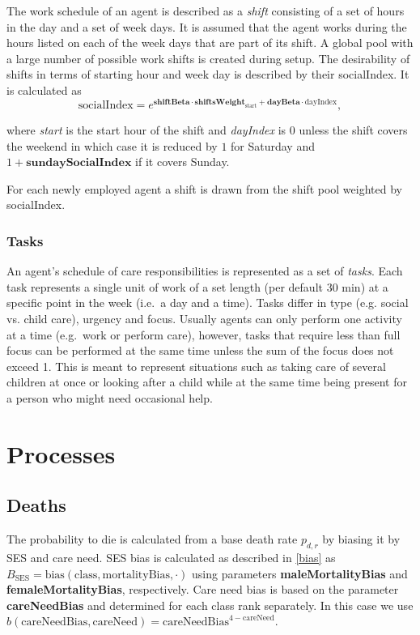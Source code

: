 \documentclass{article}
\begin{document}
The work schedule of an agent is described as a \emph{shift} consisting of a set of hours in the day and a set of week days. It is assumed that the agent works during the hours listed on each of the week days that are part of its shift. A global pool with a large number of possible work shifts is created during setup. The desirability of shifts in terms of starting hour and week day is described by their \textsf{socialIndex}. It is calculated as 
\[
\textrm{socialIndex} = e^{\textbf{shiftBeta} \cdot \textbf{shiftsWeight}_\textrm{start} + \textbf{dayBeta} \cdot \textrm{dayIndex}},
\]

where \textit{start} is the start hour of the shift and \textit{dayIndex} is $0$ unless the shift covers the weekend in which case it is reduced by $1$ for Saturday and $1+\textbf{sundaySocialIndex}$ if it covers Sunday.

For each newly employed agent a shift is drawn from the shift pool weighted by \textsf{socialIndex}.

\subsubsection*{Tasks}\label{tasks}

An agent's schedule of care responsibilities is represented as a set of \emph{tasks}. Each task represents a single unit of work of a set length (per default 30 min) at a specific point in the week (i.e.~a day and a time). Tasks differ in type (e.g. social vs. child care), urgency and focus. Usually agents can only perform one activity at a time (e.g.~work or perform care), however, tasks that require less than full focus can be performed at the same time unless the sum of the focus does not exceed 1. This is meant to represent situations such as taking care of several children at once or looking after a child while at the same time being present for a person who might need occasional help.

\section{Processes}

\subsection{Deaths} 

The probability to die is calculated from a base death rate $p_{d,r}$ by biasing it by SES and care need. SES bias is calculated as described in \ref{bias} as $B_\textrm{SES}=\textrm{bias}(\textrm{class}, \textrm{mortalityBias}, \cdot)$ using parameters \textbf{maleMortalityBias} and \textbf{femaleMortalityBias}, respectively. Care need bias is based on the parameter \textbf{careNeedBias} and determined for each class rank separately. In this case we use $b(\textrm{careNeedBias}, \textrm{careNeed}) = \textrm{careNeedBias}^{4-\textrm{careNeed}}$.
\end{document}
